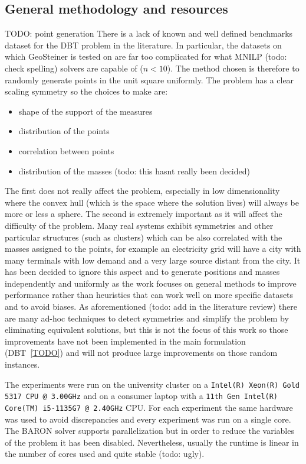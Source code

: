 \documentclass[12pt,a4paper]{article}
\numberwithin{equation}{section}
\theoremstyle{mytheorem}
\theoremstyle{myremark}
\theoremstyle{myparagraph}
\begin{document}
    \subsection{General methodology and resources}

    TODO: point generation
    There is a lack of known and well defined benchmarks dataset for the DBT problem in the literature. In particular, the
    datasets on which GeoSteiner is tested on are far too complicated for what MNILP (todo: check spelling) solvers are capable of ($n<10$).
    The method chosen is therefore to randomly generate points in the unit square uniformly.
    The problem has a clear scaling symmetry so the choices to make are:
    \begin{itemize}
        \item shape of the support of the measures
        \item distribution of the points
        \item correlation between points
        \item distribution of the masses (todo: this hasnt really been decided)
    \end{itemize}
    The first does not really affect the problem, especially in low dimensionality where the convex hull (which is the space where the solution lives)
    will always be more or less a sphere.
    The second is extremely important as it will affect the difficulty of the problem. Many real systems exhibit symmetries and other particular
    structures (such as clusters) which can be also correlated with the masses assigned to the points, for example an electricity grid will have a city with many
    terminals with low demand and a very large source distant from the city. It has been decided to ignore this aspect and to generate
    positions and masses independently and uniformly as the work focuses on general methods to improve performance rather than heuristics that
    can work well on more specific datasets and to avoid biases.
    As aforementioned (todo: add in the literature review) there are many ad-hoc techniques to detect symmetries and simplify the problem by eliminating
    equivalent solutions, but this is not the focus of this work so those improvements have not been implemented in the main formulation (DBT~\ref{TODO}) and
    will not produce large improvements on those random instances.

    The experiments were run on the university cluster on a \texttt{Intel(R) Xeon(R) Gold 5317 CPU @ 3.00GHz} and on a consumer laptop with a
    \texttt{11th Gen Intel(R) Core(TM) i5-1135G7 @ 2.40GHz} CPU. For each experiment the same hardware was used to avoid discrepancies and every experiment was run
    on a single core. The BARON solver supports parallelization but in order to reduce the variables of the problem it has been disabled. Nevertheless, usually the runtime
    is linear in the number of cores used and quite stable (todo: ugly).
\end{document}
